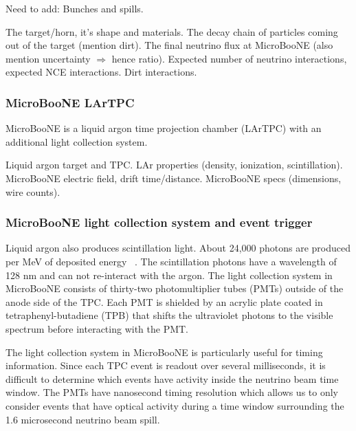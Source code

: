     Need to add: Bunches and spills.

    The target/horn, it's shape and materials.
    The decay chain of particles coming out of the target (mention dirt).
    The final neutrino flux at MicroBooNE (also mention uncertainty $\Rightarrow$ hence ratio).
    Expected number of neutrino interactions, expected NCE interactions.
    Dirt interactions.

  \subsubsection{MicroBooNE LArTPC}\label{sec:lartpc}
    MicroBooNE is a liquid argon time projection chamber (LArTPC) with an
    additional light collection system.

    Liquid argon target and TPC.
    LAr properties (density, ionization, scintillation).
    MicroBooNE electric field, drift time/distance.
    MicroBooNE specs (dimensions, wire counts).

  \subsubsection{MicroBooNE light collection system and event trigger}\label{sec:swtrigger}
    Liquid argon also produces scintillation light. About 24,000 photons are
    produced per MeV of deposited energy ~\cite{detectorpaper}. The
    scintillation photons have a wavelength of 128 nm and can not re-interact
    with the argon. The light collection system in MicroBooNE consists of
    thirty-two photomultiplier tubes (PMTs) outside of the anode side of the
    TPC. Each PMT is shielded by an acrylic plate coated in
    tetraphenyl-butadiene (TPB) that shifts the ultraviolet photons to the
    visible spectrum before interacting with the PMT.

    The light collection system in MicroBooNE is particularly useful for timing
    information. Since each TPC event is readout over several milliseconds, it
    is difficult to determine which events have activity inside the neutrino
    beam time window. The PMTs have nanosecond timing resolution which allows
    us to only consider events that have optical activity during a time window
    surrounding the 1.6 microsecond neutrino beam spill. 

